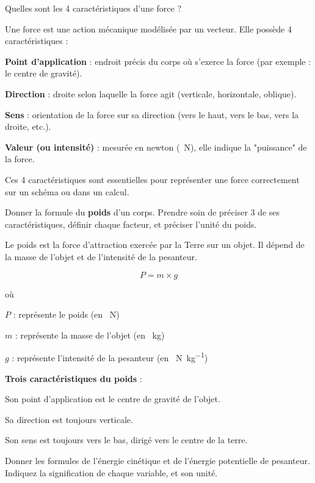 \documentclass[answers]{exam}
\begin{document}
\begin{questions}
  \question[1.5] Quelles sont les 4 caractéristiques d'une force ?
  \begin{solution}
    Une force est une action mécanique modélisée par un vecteur. Elle possède 4 caractéristiques :
  
    \begin{compactitem}
      \item \textbf{Point d'application} : endroit précis du corps où s'exerce la force (par exemple : le centre de gravité).
      \item \textbf{Direction} : droite selon laquelle la force agit (verticale, horizontale, oblique).
      \item \textbf{Sens} : orientation de la force sur sa direction (vers le haut, vers le bas, vers la droite, etc.).
      \item \textbf{Valeur (ou intensité)} : mesurée en newton (\SI{}{\newton}), elle indique la "puissance" de la force.
    \end{compactitem}
  
    Ces 4 caractéristiques sont essentielles pour représenter une force correctement sur un schéma ou dans un calcul.
    \end{solution}
  \question[1.5] Donner la formule du \textbf{poids} d'un corps. Prendre soin de préciser 3 de ses caractéristiques, définir chaque facteur, et préciser l'unité du poids.
  \begin{solution}
    Le poids est la force d'attraction exercée par la Terre sur un objet. Il dépend de la masse de l'objet et de l'intensité de la pesanteur.
  
    \[
    P = m \times g
    \]
  
    où 
  
    \begin{addmargin}[4em]{1em}
      \begin{compactitem}
          \item [$P$] : représente le poids (en \SI{}{\newton})
          \item [$m$] : représente la masse de l'objet (en \SI{}{\kilogram})
          \item [$g$] : représente l'intensité de la pesanteur (en \SI{}{\newton\per\kilogram})
      \end{compactitem}
    \end{addmargin}
  
    \textbf{Trois caractéristiques du poids} :
    \begin{compactitem}
      \item Son point d’application est le centre de gravité de l’objet.
      \item Sa direction est toujours verticale.
      \item Son sens est toujours vers le bas, dirigé vers le centre de la terre.
    \end{compactitem}
    \end{solution}
  \question[1.5] Donner les formules de l'énergie cinétique et de l'énergie potentielle de pesanteur. Indiquez la signification de chaque variable, et son unité. 
  \begin{solution}


\end{solution}
\end{questions}
\end{document}
